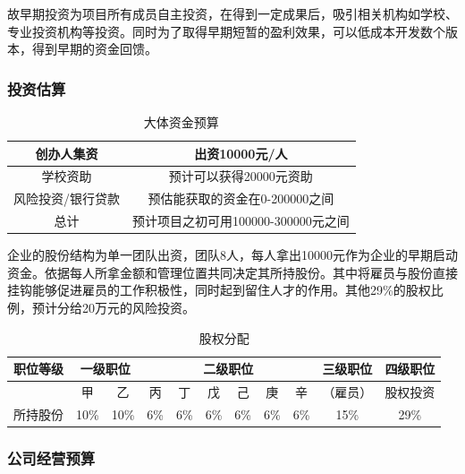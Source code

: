 \documentclass[10pt,letterpaper]{article}
\begin{document}
故早期投资为项目所有成员自主投资，在得到一定成果后，吸引相关机构如学校、专业投资机构等投资。同时为了取得早期短暂的盈利效果，可以低成本开发数个版本，得到早期的资金回馈。

\subsubsection{投资估算}

\begin{table}[!htbp]
\centering
\begin{tabular}{|c|c|}
\hline
创办人集资 & 出资10000元/人 \\
\hline
学校资助 & 预计可以获得20000元资助 \\
\hline
风险投资/银行贷款 & 预估能获取的资金在0-200000之间 \\
\hline
总计 & 预计项目之初可用100000-300000元之间 \\
\hline
\end{tabular}
\caption{大体资金预算}\label{tab:aStrangeTable}
\end{table}

企业的股份结构为单一团队出资，团队8人，每人拿出10000元作为企业的早期启动资金。依据每人所拿金额和管理位置共同决定其所持股份。其中将雇员与股份直接挂钩能够促进雇员的工作积极性，同时起到留住人才的作用。其他29\%的股权比例，预计分给20万元的风险投资。

\begin{table}[!htbp]
	\centering
	\begin{tabular}{|c|c|c|c|c|c|c|c|c|c|c|}
	\hline
    职位等级 & \multicolumn{2}{|c|}{一级职位} & \multicolumn{6}{|c|}{二级职位}  & 三级职位 & 四级职位 \\
    \hline
    ~ & 甲 & 乙 & 丙 & 丁 & 戊 & 己 & 庚 & 辛 & （雇员） & 股权投资 \\
    \hline
    所持股份 & 10\% & 10\% & 6\% & 6\% & 6\% & 6\% & 6\% & 6\%
 & 15\% & 29\% \\
 	\hline
	\end{tabular}
    \caption{股权分配}\label{tab:aStrangeTable}
\end{table}


\subsubsection{公司经营预算}
\end{document}
